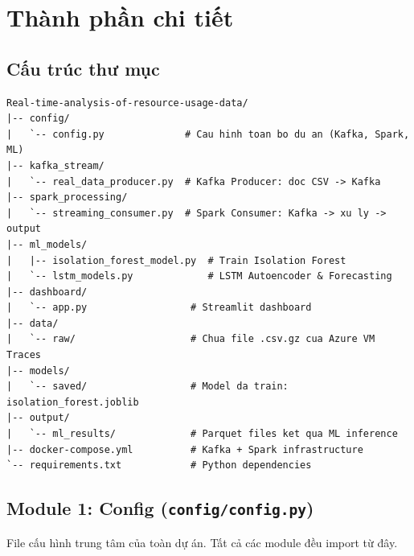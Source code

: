\documentclass[12pt,a4paper]{article}
\begin{document}
\section{Thành phần chi tiết}

\subsection{Cấu trúc thư mục}

\begin{lstlisting}[style=bash, caption={Cấu trúc thư mục dự án}]
Real-time-analysis-of-resource-usage-data/
|-- config/
|   `-- config.py              # Cau hinh toan bo du an (Kafka, Spark, ML)
|-- kafka_stream/
|   `-- real_data_producer.py  # Kafka Producer: doc CSV -> Kafka
|-- spark_processing/
|   `-- streaming_consumer.py  # Spark Consumer: Kafka -> xu ly -> output
|-- ml_models/
|   |-- isolation_forest_model.py  # Train Isolation Forest
|   `-- lstm_models.py             # LSTM Autoencoder & Forecasting
|-- dashboard/
|   `-- app.py                  # Streamlit dashboard
|-- data/
|   `-- raw/                    # Chua file .csv.gz cua Azure VM Traces
|-- models/
|   `-- saved/                  # Model da train: isolation_forest.joblib
|-- output/
|   `-- ml_results/             # Parquet files ket qua ML inference
|-- docker-compose.yml          # Kafka + Spark infrastructure
`-- requirements.txt            # Python dependencies
\end{lstlisting}

\subsection{Module 1: Config (\texttt{config/config.py})}

File cấu hình trung tâm của toàn dự án. Tất cả các module đều import từ đây.
\end{document}

